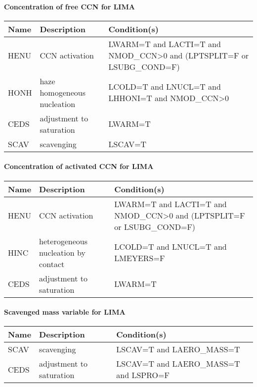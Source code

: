 \paragraph{Concentration of free CCN for LIMA}
\mbox{} %

\begin{longtable} {|p{}|p{}|p{}|}
\hline
Name & Description & Condition(s) \\
\hline \hline
\endhead
HENU   & CCN activation              & LWARM=T and LACTI=T and NMOD\_CCN>0 and (LPTSPLIT=F or LSUBG\_COND=F) \\\hline
HONH   & haze homogeneous nucleation & LCOLD=T and LNUCL=T and LHHONI=T and NMOD\_CCN>0 \\\hline
CEDS   & adjustment to saturation    & LWARM=T \\\hline
SCAV   & scavenging                  & LSCAV=T \\\hline
\end{longtable}

\paragraph{Concentration of activated CCN for LIMA}
\mbox{} %

\begin{longtable} {|p{}|p{}|p{}|}
\hline
Name & Description & Condition(s) \\
\hline \hline
\endhead
HENU   & CCN activation                      & LWARM=T and LACTI=T and NMOD\_CCN>0 and (LPTSPLIT=F or LSUBG\_COND=F) \\\hline
HINC   & heterogeneous nucleation by contact & LCOLD=T and LNUCL=T and LMEYERS=F \\\hline
CEDS   & adjustment to saturation            & LWARM=T \\\hline
\end{longtable}

\paragraph{Scavenged mass variable for LIMA}
\mbox{} %

\begin{longtable} {|p{}|p{}|p{}|}
\hline
Name & Description & Condition(s) \\
\hline \hline
\endhead
SCAV   & scavenging               & LSCAV=T and LAERO\_MASS=T \\\hline
CEDS   & adjustment to saturation & LSCAV=T and LAERO\_MASS=T and LSPRO=F \\\hline
\end{longtable}

